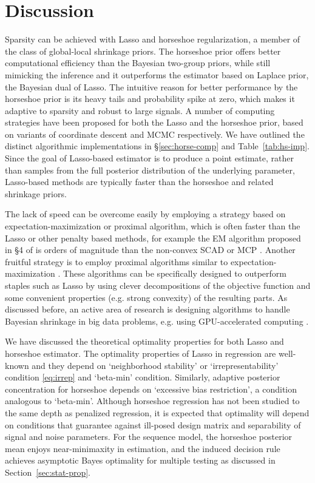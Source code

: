\documentclass[sts,preprint]{imsart}
\begin{document}
\section{Discussion}\label{sec:9}

Sparsity can be achieved with Lasso and horseshoe regularization, a member of the class of global-local shrinkage priors. The horseshoe prior offers better computational efficiency than the Bayesian two-group priors, while still mimicking the inference and it outperforms the estimator based on Laplace prior, the Bayesian dual of Lasso. The intuitive reason for better performance by the horseshoe prior is its heavy tails and probability spike at zero, which makes it adaptive to sparsity and robust to large signals. A number of computing strategies have been proposed for both the Lasso and the horseshoe prior, based on variants of coordinate descent and MCMC respectively.  We have outlined the distinct algorithmic implementations in \S \ref{sec:horse-comp} and Table~\ref{tab:hs-imp}. Since the goal of Lasso-based estimator is to produce a point estimate, rather than samples from the full posterior distribution of the underlying parameter, Lasso-based methods are typically faster than the horseshoe and related shrinkage priors.

The lack of speed can be overcome easily by employing a strategy based on expectation-maximization or proximal algorithm, which is often faster than the Lasso or other penalty based methods, for example the EM algorithm proposed in \S 4 of \citet{bhadra2017horseshoe} is orders of magnitude than the non-convex SCAD or MCP \citep[\textit{vide} Table 1]{bhadra2017horseshoe}. Another fruitful strategy is to employ proximal algorithms similar to expectation-maximization \citep{polson2015proximal}. These algorithms can be specifically designed to outperform staples such as Lasso \citep{bhadra2017horseshoe} by using clever decompositions of the objective function and some convenient properties (e.g. strong convexity) of the resulting parts. As discussed before, an active area of research is designing algorithms to handle Bayesian shrinkage in big data problems, e.g. using GPU-accelerated computing \citep{terenin_gpu-accelerated_2016}. 

We have discussed the theoretical optimality properties for both Lasso and horseshoe estimator. The optimality properties of Lasso in regression are well-known and they depend on `neighborhood stability' or `irrepresentability' condition \eqref{eq:irrep} and `beta-min' condition. Similarly, adaptive posterior concentration for horseshoe depends on `excessive bias restriction', a condition analogous to `beta-min'. Although horseshoe regression has not been studied to the same depth as penalized regression, it is expected that optimality will depend on conditions that guarantee against ill-posed design matrix and separability of signal and noise parameters. For the sequence model, the horseshoe posterior mean enjoys near-minimaxity in estimation, and the induced decision rule achieves asymptotic Bayes optimality for multiple testing as discussed in Section~\ref{sec:stat-prop}. 
\end{document}
